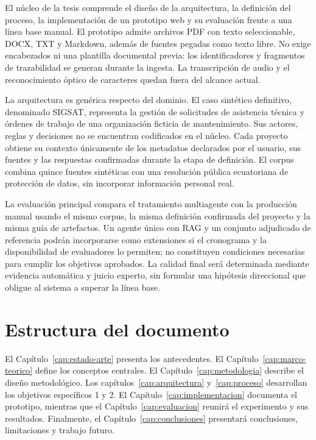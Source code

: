 El núcleo de la tesis comprende el diseño de la arquitectura, la definición del proceso, la implementación de un prototipo web y su evaluación frente a una línea base manual. El prototipo admite archivos PDF con texto seleccionable, DOCX, TXT y Markdown, además de fuentes pegadas como texto libre. No exige encabezados ni una plantilla documental previa: los identificadores y fragmentos de trazabilidad se generan durante la ingesta. La transcripción de audio y el reconocimiento óptico de caracteres quedan fuera del alcance actual.

La arquitectura es genérica respecto del dominio. El caso sintético definitivo, denominado SIGSAT, representa la gestión de solicitudes de asistencia técnica y órdenes de trabajo de una organización ficticia de mantenimiento. Sus actores, reglas y decisiones no se encuentran codificados en el núcleo. Cada proyecto obtiene su contexto únicamente de los metadatos declarados por el usuario, sus fuentes y las respuestas confirmadas durante la etapa de definición. El corpus combina quince fuentes sintéticas con una resolución pública ecuatoriana de protección de datos, sin incorporar información personal real.

La evaluación principal compara el tratamiento multiagente con la producción manual usando el mismo corpus, la misma definición confirmada del proyecto y la misma guía de artefactos. Un agente único con RAG y un conjunto adjudicado de referencia podrán incorporarse como extensiones si el cronograma y la disponibilidad de evaluadores lo permiten; no constituyen condiciones necesarias para cumplir los objetivos aprobados. La calidad final será determinada mediante evidencia automática y juicio experto, sin formular una hipótesis direccional que obligue al sistema a superar la línea base.

\section{Estructura del documento}

El Capítulo~\ref{cap:estado-arte} presenta los antecedentes. El Capítulo~\ref{cap:marco-teorico} define los conceptos centrales. El Capítulo~\ref{cap:metodologia} describe el diseño metodológico. Los capítulos~\ref{cap:arquitectura} y~\ref{cap:proceso} desarrollan los objetivos específicos 1 y 2. El Capítulo~\ref{cap:implementacion} documenta el prototipo, mientras que el Capítulo~\ref{cap:evaluacion} reunirá el experimento y sus resultados. Finalmente, el Capítulo~\ref{cap:conclusiones} presentará conclusiones, limitaciones y trabajo futuro.
